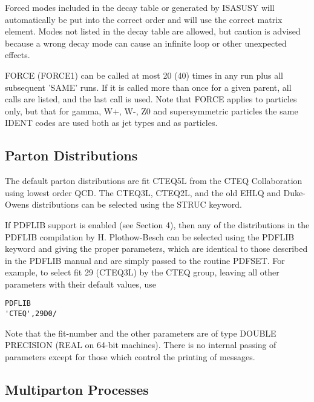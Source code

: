       Forced modes included in the decay table or generated by ISASUSY
will automatically be put into the correct order and will use the
correct matrix element. Modes not listed in the decay table are
allowed, but caution is advised because a wrong decay mode can cause
an infinite loop or other unexpected effects.

      FORCE (FORCE1) can be called at most 20 (40) times in any run plus
all subsequent 'SAME' runs. If it is called more than once for a given
parent, all calls are listed, and the last call is used. Note that FORCE
applies to particles only, but that for gamma, W+, W-, Z0 and
supersymmetric particles the same IDENT codes are used both as jet types
and as particles.

\subsection{Parton Distributions}

      The default parton distributions are fit CTEQ5L from the CTEQ
Collaboration using lowest order QCD. The CTEQ3L, CTEQ2L, and the old
EHLQ and Duke-Owens distributions can be selected using the STRUC
keyword.

      If PDFLIB support is enabled (see Section 4), then any of the
distributions in the PDFLIB compilation by H. Plothow-Besch can be
selected using the PDFLIB keyword and giving the proper parameters,
which are identical to those described in the PDFLIB manual and are
simply passed to the routine PDFSET. For example, to select fit 29
(CTEQ3L) by the CTEQ group, leaving all other parameters with their
default values, use
\begin{verbatim}
PDFLIB
'CTEQ',29D0/
\end{verbatim}
Note that the fit-number and the other parameters are of type DOUBLE
PRECISION (REAL on 64-bit machines). There is no internal passing of
parameters except for those which control the printing of messages.

\subsection{Multiparton Processes}

